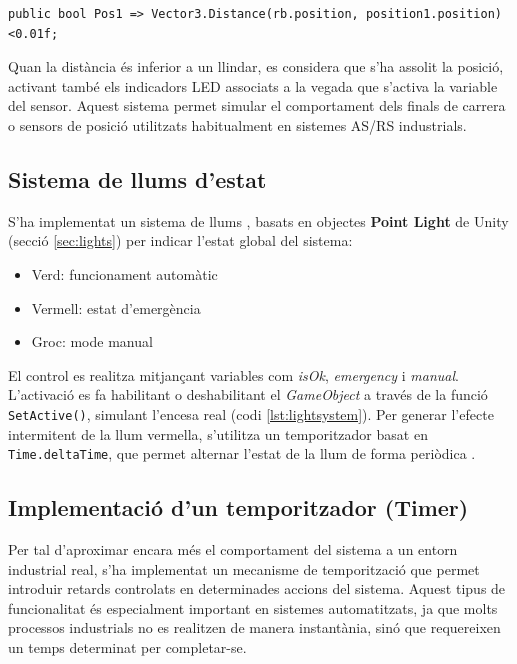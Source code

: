 \documentclass[a4paper,11pt,DIV=13,headings=normal,abstract=true,twoside=semi]{article}
\begin{document}
\begin{lstlisting}[style=simple]
public bool Pos1 => Vector3.Distance(rb.position, position1.position) <0.01f;
\end{lstlisting}

Quan la distància és inferior a un llindar, es considera que s'ha assolit la posició, activant també els indicadors LED associats a la vegada que s'activa la variable del sensor. Aquest sistema permet simular el comportament dels finals de carrera o sensors de posició utilitzats habitualment en sistemes AS/RS industrials.

\subsection{Sistema de llums d'estat}

S'ha implementat un sistema de llums \cite{UnityLighting}, basats en objectes \textbf{Point Light} de Unity (secció \ref{sec:lights}) per indicar l'estat global del sistema:

\begin{itemize}
\item Verd: funcionament automàtic
\item Vermell: estat d'emergència
\item Groc: mode manual
\end{itemize}

El control es realitza mitjançant variables com \textit{isOk}, \textit{emergency} i \textit{manual}. L'activació es fa habilitant o deshabilitant el \textit{GameObject} a través de la funció \texttt{SetActive()}, simulant l'encesa real (codi \ref{lst:lightsystem}). Per generar l'efecte intermitent de la llum vermella, s'utilitza un temporitzador basat en \texttt{Time.deltaTime}, que permet alternar l'estat de la llum de forma periòdica \cite{UnityTime}.

\subsection{Implementació d'un temporitzador (Timer)}
\label{sec:timers}


Per tal d'aproximar encara més el comportament del sistema a un entorn industrial real, s'ha implementat un mecanisme de temporització que permet introduir retards controlats en determinades accions del sistema. Aquest tipus de funcionalitat és especialment important en sistemes automatitzats, ja que molts processos industrials no es realitzen de manera instantània, sinó que requereixen un temps determinat per completar-se. 
\end{document}

